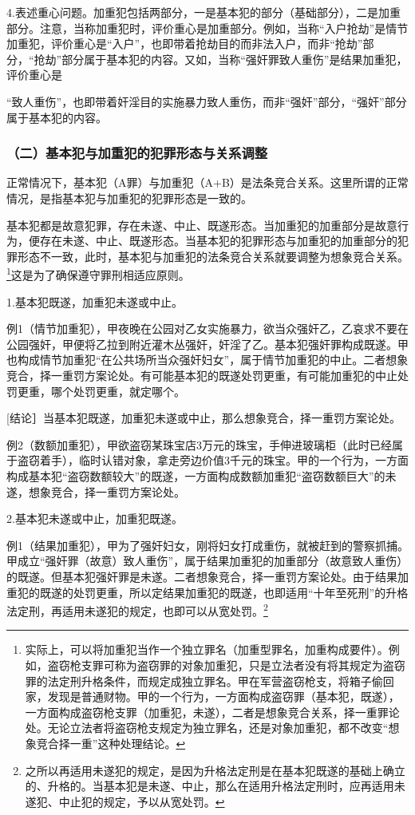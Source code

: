 4.表述重心问题。加重犯包括两部分，一是基本犯的部分（基础部分），二是加重部分。注意，当称加重犯时，评价重心是加重部分。例如，当称“入户抢劫”是情节加重犯，评价重心是“入户”，也即带着抢劫目的而非法入户，而非“抢劫”部分，“抢劫”部分属于基本犯的内容。又如，当称“强奸罪致人重伤”是结果加重犯，评价重心是

“致人重伤”，也即带着奸淫目的实施暴力致人重伤，而非“强奸”部分，“强奸”部分属于基本犯的内容。

\subsubsection*{（二）基本犯与加重犯的犯罪形态与关系调整}

正常情况下，基本犯（A罪）与加重犯（A+B）是法条竞合关系。这里所谓的正常情况，是指基本犯与加重犯的犯罪形态是一致的。

基本犯都是故意犯罪，存在未遂、中止、既遂形态。当加重犯的加重部分是故意行为，便存在未遂、中止、既遂形态。当基本犯的犯罪形态与加重犯的加重部分的犯罪形态不一致，此时，基本犯与加重犯的法条竞合关系就要调整为想象竞合关系。\footnote{实际上，可以将加重犯当作一个独立罪名（加重型罪名，加重构成要件）。例如，盗窃枪支罪可称为盗窃罪的对象加重犯，只是立法者没有将其规定为盗窃罪的法定刑升格条件，而规定成独立罪名。甲在军营盗窃枪支，将箱子偷回家，发现是普通财物。甲的一个行为，一方面构成盗窃罪（基本犯，既遂），一方面构成盗窃枪支罪（加重犯，未遂），二者是想象竞合关系，择一重罪论处。无论立法者将盗窃枪支规定为独立罪名，还是对象加重犯，都不改变“想象竞合择一重”这种处理结论。}这是为了确保遵守罪刑相适应原则。

1.基本犯既遂，加重犯未遂或中止。

例1（情节加重犯），甲夜晚在公园对乙女实施暴力，欲当众强奸乙，乙哀求不要在公园强奸，甲便将乙拉到附近灌木丛强奸，奸淫了乙。基本犯强奸罪构成既遂。甲也构成情节加重犯“在公共场所当众强奸妇女”，属于情节加重犯的中止。二者想象竞合，择一重罚方案论处。有可能基本犯的既遂处罚更重，有可能加重犯的中止处罚更重，哪个处罚更重，就定哪个。

[结论］当基本犯既遂，加重犯未遂或中止，那么想象竞合，择一重罚方案论处。

例2（数额加重犯），甲欲盗窃某珠宝店3万元的珠宝，手伸进玻璃柜（此时已经属于盗窃着手），临时认错对象，拿走旁边价值3千元的珠宝。甲的一个行为，一方面构成基本犯“盗窃数额较大”的既遂，一方面构成数额加重犯“盗窃数额巨大”的未遂，想象竞合，择一重罚方案论处。

2.基本犯未遂或中止，加重犯既遂。

例1（结果加重犯），甲为了强奸妇女，刚将妇女打成重伤，就被赶到的警察抓捕。甲成立“强奸罪（故意）致人重伤”，属于结果加重犯的加重部分（故意致人重伤）的既遂。但基本犯强奸罪是未遂。二者想象竞合，择一重罚方案论处。由于结果加重犯的既遂的处罚更重，所以定结果加重犯的既遂，也即适用“十年至死刑”的升格法定刑，再适用未遂犯的规定，也即可以从宽处罚。\footnote{之所以再适用未遂犯的规定，是因为升格法定刑是在基本犯既遂的基础上确立的、升格的。当基本犯是未遂、中止，那么在适用升格法定刑时，应再适用未遂犯、中止犯的规定，予以从宽处罚。}

